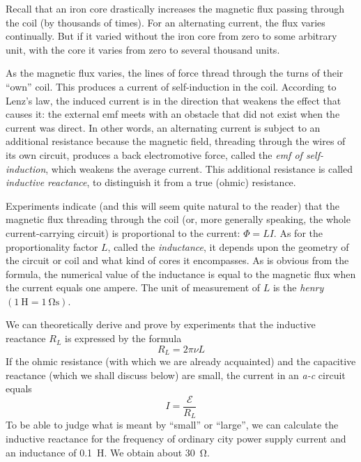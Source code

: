 Recall that an iron core drastically increases the magnetic flux passing through the coil (by thousands of times). For an alternating current, the flux varies continually. But if it varied without the iron core from zero to some arbitrary unit, with the core it varies from zero to several thousand units.

As the magnetic flux varies, the lines of force thread through the turns of their ``own'' coil. This produces a current of self-induction in the coil. According to Lenz's law, the induced current is in the direction that weakens the effect that causes it: the external emf meets with an obstacle that did not exist when the current was direct. In other words, an alternating current is subject to an additional resistance because the magnetic field, threading through the wires of its own circuit, produces a back electromotive force, called the \emph{emf of self-induction}, which weakens the average current. This additional resistance is called \emph{inductive reactance}, to distinguish it from a true (ohmic) resistance.

Experiments indicate (and this will seem quite natural to the reader) that the magnetic flux threading through the coil (or, more generally speaking, the whole
current-carrying circuit) is proportional to the current: $\Phi = LI$. As for the proportionality factor $L$, called the \emph{inductance}, it depends upon the geometry of the circuit or coil and what kind of cores it encompasses. As is obvious from the formula, the numerical value of the inductance is equal to the magnetic flux when the current equals one ampere. The unit of measurement of $L$ is the \emph{henry} $(\SI{1}{\henry}= \SI{1}{\ohm\second})$.

We can theoretically derive and prove by experiments that the inductive reactance $R_{L}$ is expressed by the formula
\begin{equation*}%
R_{L} = 2\pi \nu L
\end{equation*}
If the ohmic resistance (with which we are already acquainted) and the capacitive reactance (which we shall discuss below) are small, the current in an \emph{a-c} circuit equals
\begin{equation*}%
I = \frac{\mathcal{E}}{R_{L}}
\end{equation*}
To be able to judge what is meant by ``small'' or ``large'', we can calculate the inductive reactance for the frequency of ordinary city power supply current and an inductance of \SI{0.1}{\henry}. We obtain about \SI{30}{\ohm}.

